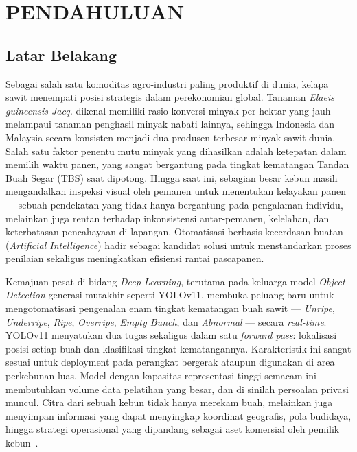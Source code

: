 \chapter{PENDAHULUAN}
\label{chap:pendahuluan}

\section{Latar Belakang}
\label{sec:latar-belakang}
Sebagai salah satu komoditas agro-industri paling produktif di dunia, kelapa sawit menempati posisi strategis dalam perekonomian global. Tanaman \emph{Elaeis guineensis Jacq.} dikenal memiliki rasio konversi minyak per hektar yang jauh melampaui tanaman penghasil minyak nabati lainnya, sehingga Indonesia dan Malaysia secara konsisten menjadi dua produsen terbesar minyak sawit dunia. Salah satu faktor penentu mutu minyak yang dihasilkan adalah ketepatan dalam memilih waktu panen, yang sangat bergantung pada tingkat kematangan Tandan Buah Segar (TBS) saat dipotong. Hingga saat ini, sebagian besar kebun masih mengandalkan inspeksi visual oleh pemanen untuk menentukan kelayakan panen~\cite{sinambela2019prediksi} --- sebuah pendekatan yang tidak hanya bergantung pada pengalaman individu, melainkan juga rentan terhadap inkonsistensi antar-pemanen, kelelahan, dan keterbatasan pencahayaan di lapangan. Otomatisasi berbasis kecerdasan buatan (\emph{Artificial Intelligence}) hadir sebagai kandidat solusi untuk menstandarkan proses penilaian sekaligus meningkatkan efisiensi rantai pascapanen.

Kemajuan pesat di bidang \emph{Deep Learning}, terutama pada keluarga model \emph{Object Detection} generasi mutakhir seperti YOLOv11, membuka peluang baru untuk mengotomatisasi pengenalan enam tingkat kematangan buah sawit --- \emph{Unripe}, \emph{Underripe}, \emph{Ripe}, \emph{Overripe}, \emph{Empty Bunch}, dan \emph{Abnormal} --- secara \emph{real-time}. YOLOv11 menyatukan dua tugas sekaligus dalam satu \emph{forward pass}: lokalisasi posisi setiap buah dan klasifikasi tingkat kematangannya. Karakteristik ini sangat sesuai untuk deployment pada perangkat bergerak ataupun digunakan di area perkebunan luas. Model dengan kapasitas representasi tinggi semacam ini membutuhkan volume data pelatihan yang besar, dan di sinilah persoalan privasi muncul. Citra dari sebuah kebun tidak hanya merekam buah, melainkan juga menyimpan informasi yang dapat menyingkap koordinat geografis, pola budidaya, hingga strategi operasional yang dipandang sebagai aset komersial oleh pemilik kebun~\cite{wardhono2024pelindungan}.

